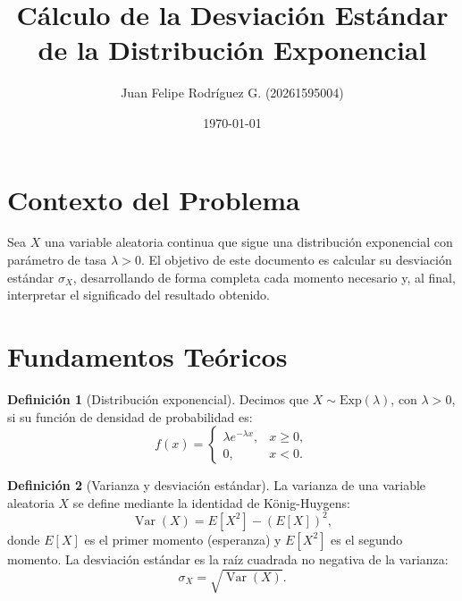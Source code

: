 \documentclass{article}
\title{Cálculo de la Desviación Estándar de la Distribución Exponencial}
\author{Juan Felipe Rodríguez G. (20261595004)}
\date{\today}
\theoremstyle{definition}
\newtheorem{definition}{Definición}
\begin{document}
    \maketitle

    \section*{Contexto del Problema}

    Sea $X$ una variable aleatoria continua que sigue una distribución exponencial con parámetro de tasa $\lambda > 0$. El objetivo de este documento es calcular su desviación estándar $\sigma_X$, desarrollando de forma completa cada momento necesario y, al final, interpretar el significado del resultado obtenido.

    \section*{Fundamentos Teóricos}

    \begin{definition}[Distribución exponencial]
    Decimos que $X \sim \mathrm{Exp}(\lambda)$, con $\lambda > 0$, si su función de densidad de probabilidad es:
    \begin{equation} \label{eq:pdf}
        f(x) =
        \begin{cases}
            \lambda e^{-\lambda x}, & x \geq 0, \\[4pt]
            0,                       & x < 0.
        \end{cases}
    \end{equation}
    \end{definition}

    \begin{definition}[Varianza y desviación estándar]
    La varianza de una variable aleatoria $X$ se define mediante la identidad de König-Huygens:
    \begin{equation} \label{eq:varianza}
        \operatorname{Var}(X) = E[X^2] - \left(E[X]\right)^2,
    \end{equation}
    donde $E[X]$ es el primer momento (esperanza) y $E[X^2]$ es el segundo momento. La desviación estándar es la raíz cuadrada no negativa de la varianza:
    \begin{equation} \label{eq:sigma}
        \sigma_X = \sqrt{\operatorname{Var}(X)}.
    \end{equation}
    \end{definition}
\end{document}
